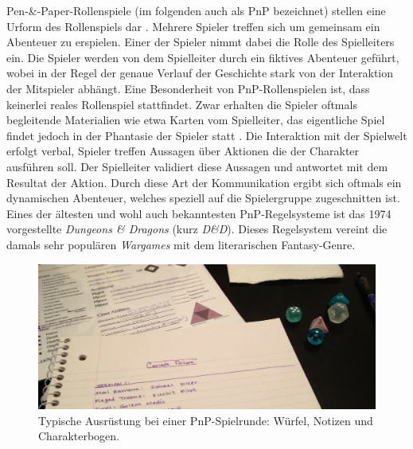 Pen-\&-Paper-Rollenspiele (im folgenden auch als PnP bezeichnet) stellen eine Urform des Rollenspiels dar \cite{Apperley2006}. Mehrere Spieler treffen sich um gemeinsam ein Abenteuer zu erspielen. Einer der Spieler nimmt dabei die Rolle des Spielleiters ein. Die Spieler werden von dem Spielleiter durch ein fiktives Abenteuer geführt, wobei in der Regel der genaue Verlauf der Geschichte stark von der Interaktion der Mitspieler abhängt. \cite{Apperley2006}\newline 
Eine Besonderheit von PnP-Rollenspielen ist, dass keinerlei reales Rollenspiel stattfindet. Zwar erhalten die Spieler oftmals begleitende Materialien wie etwa Karten vom Spielleiter, das eigentliche Spiel findet jedoch in der Phantasie der Spieler statt \cite{Copier2005}. Die Interaktion mit der Spielwelt erfolgt verbal, Spieler treffen Aussagen über Aktionen die der Charakter ausführen soll. Der Spielleiter validiert diese Aussagen und antwortet mit dem Resultat der Aktion. Durch diese Art der Kommunikation ergibt sich oftmals ein dynamischen Abenteuer, welches speziell auf die Spielergruppe zugeschnitten ist. \cite{Drachen2008}\newline
Eines der ältesten und wohl auch bekanntesten PnP-Regelsysteme ist das 1974 vorgestellte \emph{Dungeons \& Dragons} (kurz \emph{D\&D}). Dieses Regelsystem vereint die damals sehr populären \emph{Wargames} mit dem literarischen Fantasy-Genre. \cite{Copier2005}

\begin{figure}[htbp]
  \begin{minipage}{\textwidth}
	\centering
		\includegraphics[width=1.00\textwidth]{media/pnp_supplies.png}
	\caption [Typische Ausrüstung bei einer PnP-Spielrunde: Würfel, Notizen und Charakterbogen.]{Typische Ausrüstung bei einer PnP-Spielrunde: Würfel, Notizen und Charakterbogen.\protect\footnotemark[1]}
	\label{fig:pnp_supplies}
		 \end{minipage}
\end{figure}


